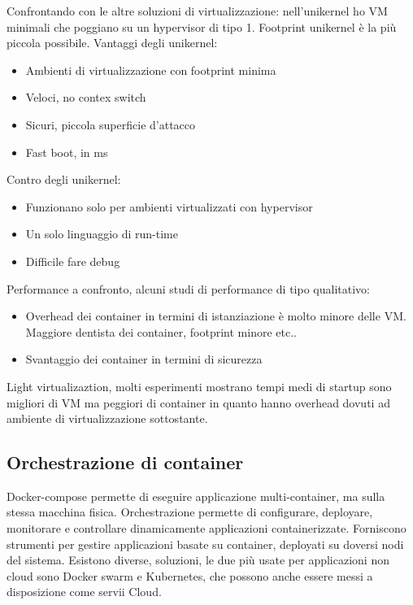 \documentclass{article}
\begin{document}
Confrontando con le altre soluzioni di virtualizzazione: nell'unikernel ho VM minimali che poggiano su un hypervisor di tipo 1. Footprint unikernel è la più piccola possibile. Vantaggi degli unikernel:
\begin{itemize}
\item Ambienti di virtualizzazione con footprint minima
\item Veloci, no contex switch
\item Sicuri, piccola superficie d'attacco
\item Fast boot, in ms
\end{itemize}
Contro degli unikernel:
\begin{itemize}
\item Funzionano solo per ambienti virtualizzati con hypervisor
\item Un solo linguaggio di run-time
\item Difficile fare debug
\end{itemize}
Performance a confronto, alcuni studi di performance di tipo qualitativo:
\begin{itemize}
\item Overhead dei container in termini di istanziazione è molto minore delle VM. Maggiore dentista dei container, footprint minore etc..
\item Svantaggio dei container in termini di sicurezza
\end{itemize}
Light virtualizaztion, molti esperimenti mostrano tempi medi di startup sono migliori di VM ma peggiori di container in quanto hanno overhead dovuti ad ambiente di virtualizzazione sottostante.
\subsection{Orchestrazione di container}
Docker-compose permette di eseguire applicazione multi-container, ma sulla stessa macchina fisica. Orchestrazione permette di configurare, deployare, monitorare e controllare dinamicamente applicazioni containerizzate. Forniscono strumenti per gestire applicazioni basate su container, deployati su doversi nodi del sistema. Esistono diverse, soluzioni, le due più usate per applicazioni non cloud sono Docker swarm e Kubernetes, che possono anche essere messi a disposizione come servii Cloud.
\end{document}
